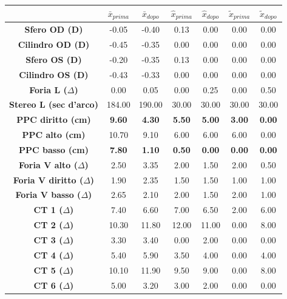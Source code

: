 \begin{table}[H]
\begin{center}
\begin{tabular}{|c|c|c|c|c|c|c|} \hline
{\textbf{}} & {\textbf{$\bar{x}_{prima}$}}} & {\textbf{$\bar{x}_{dopo}$}}& {\textbf{$\hat{x}_{prima}$}}} & {\textbf{$\hat{x}_{dopo}$}}} & {\textbf{$\tilde{x}_{prima}$}}} & {\textbf{$\tilde{x}_{dopo}$}}}\\ \hline
\textbf{Sfero OD (D)} & -0.05 & -0.40 & 0.13 & 0.00 & 0.00 & 0.00 \\ \hline
\textbf{Cilindro OD (D)} & -0.45 & -0.35 & 0.00 & 0.00 & 0.00 & 0.00 \\ \hline
\textbf{Sfero OS (D)} & -0.20 & -0.35 & 0.13 & 0.00 & 0.00 & 0.00 \\ \hline
\textbf{Cilindro OS (D)} & -0.43 & -0.33 & 0.00 & 0.00 & 0.00 & 0.00 \\ \hline
\textbf{Foria L ($\Delta$)} & 0.00 & 0.05 & 0.00 & 0.25 & 0.00 & 0.50 \\ \hline
\textbf{Stereo L (sec d'arco)} & 184.00 & 190.00 & 30.00 & 30.00 & 30.00 & 30.00 \\ \hline
\textbf{PPC diritto (cm)} & \textbf{9.60} & \textbf{4.30} & \textbf{5.50} & \textbf{5.00} & \textbf{3.00} & \textbf{0.00} \\ \hline
\textbf{PPC alto (cm)} & 10.70 & 9.10 & 6.00 & 6.00 & 6.00 & 0.00\\ \hline
\textbf{PPC basso (cm)} & \textbf{7.80} & \textbf{1.10} & \textbf{0.50} & \textbf{0.00} & \textbf{0.00} & \textbf{0.00} \\ \hline
\textbf{Foria V alto ($\Delta$)} & 2.50 & 3.35 & 2.00 & 1.50 & 2.00 & 0.50 \\ \hline
\textbf{Foria V diritto ($\Delta$)} & 1.90 & 2.35 & 1.50 & 1.50 & 1.00 & 1.00 \\ \hline
\textbf{Foria V basso ($\Delta$)} & 2.65 & 2.10 & 2.00 & 1.50 & 2.00 & 1.00 \\ \hline
\textbf{CT 1 ($\Delta$)} & 7.40 & 6.60 & 7.00 & 6.50 & 2.00 & 6.00 \\ \hline
\textbf{CT 2 ($\Delta$)} & 10.30 & 11.80 & 12.00 & 11.00 & 0.00 & 8.00\\ \hline
\textbf{CT 3 ($\Delta$)} & 3.30 & 3.40 & 0.00 & 2.00 & 0.00 & 0.00 \\ \hline
\textbf{CT 4 ($\Delta$)} & 5.40 & 5.90 & 3.50 & 4.00 & 0.00 & 4.00 \\ \hline
\textbf{CT 5 ($\Delta$)} & 10.10 & 11.90 & 9.50 & 9.00 & 0.00 & 8.00 \\ \hline
\textbf{CT 6 ($\Delta$)} & 5.00 & 3.20 & 3.00 & 2.00 & 0.00 & 0.00 \\ \hline

\end{tabular}
\end{center}
\end{table}
